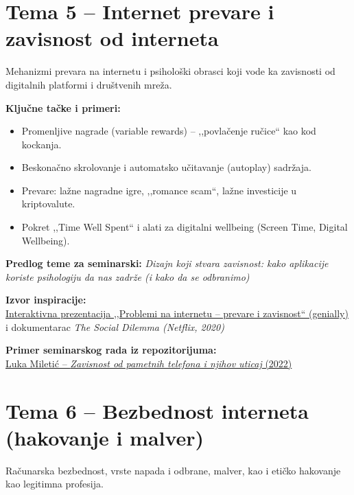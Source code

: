 \documentclass[12pt,a4paper]{article}
\begin{document}
\section{Tema 5 -- Internet prevare i zavisnost od interneta}

Mehanizmi prevara na internetu i psihološki obrasci koji vode ka zavisnosti od
digitalnih platformi i društvenih mreža.

\textbf{Ključne tačke i primeri:}
\begin{itemize}
    \item Promenljive nagrade (variable rewards) -- ,,povlačenje ručice`` kao kod
          kockanja.
    \item Beskonačno skrolovanje i automatsko učitavanje (autoplay) sadržaja.
    \item Prevare: lažne nagradne igre, ,,romance scam``, lažne investicije u
          kriptovalute.
    \item Pokret ,,Time Well Spent`` i alati za digitalni wellbeing (Screen Time,
          Digital Wellbeing).
\end{itemize}

\textbf{Predlog teme za seminarski:}
\emph{Dizajn koji stvara zavisnost: kako aplikacije koriste psihologiju da nas zadrže
(i kako da se odbranimo)}

\textbf{Izvor inspiracije:}\\
\href{https://view.genial.ly/62431d6917ac64001885c51c/presentation-problemi-na-internetu}%
{Interaktivna prezentacija ,,Problemi na internetu -- prevare i zavisnost`` (genially)}\\
i dokumentarac \emph{The Social Dilemma (Netflix, 2020)}

\textbf{Primer seminarskog rada iz repozitorijuma:}\\
\href{https://github.com/sanastojanovic/RID/blob/main/rid_2022_seminarski/mi17091_Miletic_Luka/predavanje_2/Zavisnost_pametnih_telefona_i_njihov_uticaj.pdf}%
{Luka Miletić -- \emph{Zavisnost od pametnih telefona i njihov uticaj} (2022)}

\section{Tema 6 -- Bezbednost interneta (hakovanje i malver)}

Računarska bezbednost, vrste napada i odbrane, malver, kao i etičko hakovanje kao
legitimna profesija.
\end{document}
